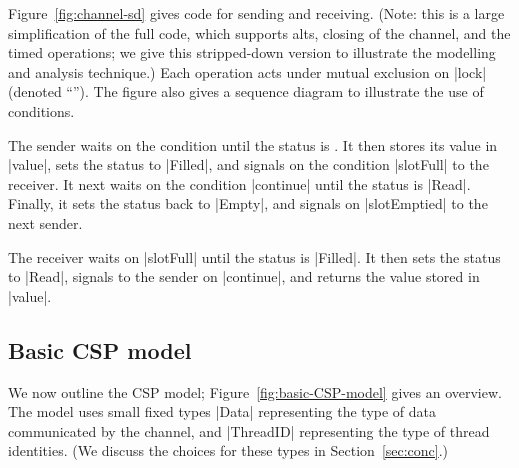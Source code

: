 
Figure~\ref{fig:channel-sd} gives code for sending and receiving.  (Note: this
is a large simplification of the full code, which supports alts, closing of
the channel, and the timed operations; we give this stripped-down version to
illustrate the modelling and analysis technique.)  Each operation acts under
mutual exclusion on |lock| (denoted ``'').  The
figure also gives a sequence diagram to illustrate the use of conditions.

The sender waits on the condition  until the status is
.  It then stores its value in |value|, sets the status to
|Filled|, and signals on the condition |slotFull| to the receiver.  It next 
waits on the condition |continue| until the status is |Read|.  Finally, it
sets the status back to |Empty|, and signals on |slotEmptied| to the next
sender.

The receiver waits on |slotFull| until the status is |Filled|.  It then sets
the status to |Read|, signals to the sender on |continue|, and returns the
value stored in |value|.


\subsection{Basic CSP model}

We now outline the CSP model; Figure~\ref{fig:basic-CSP-model} gives an
overview.  The model uses small fixed types |Data| representing the type of
data communicated by the channel, and |ThreadID| representing the type of
thread identities.  (We discuss the choices for these types in
Section~\ref{sec:conc}.)


